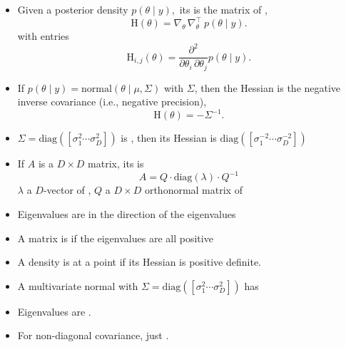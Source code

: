\documentclass[10pt]{report}
\begin{document}
\begin{itemize}
\item Given a posterior density $p(\theta \mid y),$ its  is the
  matrix of ,
  $$
  \textrm{H}(\theta) = \nabla_{\!\!\theta} \, \nabla_{\!\!\theta}^\top \ p(\theta \mid y).
  $$
  with entries
  $$
  \textrm{H}_{i, j}(\theta) = \frac{\partial^2}{\partial \theta_i \, \partial
    \theta_j} p(\theta \mid y).
  $$
\item If $p(\theta \mid y) = \textrm{normal}(\theta \mid \mu, \Sigma)$ with
   $\Sigma$, then the Hessian is the
  negative inverse covariance (i.e., negative precision),
  $$
  \textrm{H}(\theta) = -\Sigma^{-1}.
  $$
\item 
  
  $\Sigma = \textrm{diag}([\sigma_1^2 \cdots \sigma_D^2])$ is
  , then its Hessian is $\textrm{diag}([\sigma_1^{-2} \cdots
  \sigma_D^{-2}])$
\end{itemize}


\begin{itemize}
\item If $A$ is a $D \times D$ matrix, its  is
  $$
  A = Q \cdot \textrm{diag}(\lambda) \cdot Q^{-1}
  $$
  $\lambda$ a $D$-vector of , $Q$ a
  $D \times D$ orthonormal matrix of 
\item Eigenvalues are  in the direction of the eigenvalues
\end{itemize}

\begin{itemize}
\item A matrix is  if the eigenvalues are
  all positive
\item A density is  at a point if its Hessian is positive definite. 
\item A multivariate normal with  $\Sigma =
  \textrm{diag}([\sigma_1^2 \cdots \sigma_D^2])$ has
\item Eigenvalues are .
\item For non-diagonal covariance, just .
\end{itemize}
\end{document}
